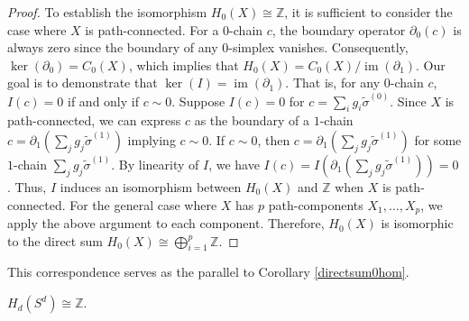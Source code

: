\begin{proof}
	To establish the isomorphism \( H_{0}(X) \cong \mathbb{Z} \), it is sufficient to consider the case where \( X \) is path-connected. For a \( 0 \)-chain \( c \), the boundary operator \( \partial_{0}(c) \) is always zero since the boundary of any \( 0 \)-simplex vanishes. Consequently, \( \ker(\partial_{0}) = C_{0}(X) \), which implies that $H_{0}(X) = C_{0}(X) / \operatorname{im}(\partial_{1})$. Our goal is to demonstrate that \( \ker(I) = \operatorname{im}(\partial_{1}) \). That is, for any \( 0 \)-chain \( c \), \( I(c) = 0 \) if and only if \( c \sim 0 \). Suppose \( I(c) = 0 \) for \( c = \sum_{i} g_{i} \tilde{\sigma}^{(0)} \). Since \( X \) is path-connected, we can express \( c \) as the boundary of a \( 1 \)-chain $c = \partial_{1} ( \sum_{j} g_{j} \tilde{\sigma}^{(1)})$ implying $c \sim 0$. If \( c \sim 0 \), then \( c = \partial_{1} ( \sum_{j} g_{j} \tilde{\sigma}^{(1)}) \) for some \( 1 \)-chain \( \sum_{j} g_{j} \tilde{\sigma}^{(1)} \). By linearity of \( I \), we have	$I(c) = I( \partial_{1} ( \sum_{j} g_{j} \tilde{\sigma}^{(1)} )) = 0$. Thus, \( I \) induces an isomorphism between \( H_{0}(X) \) and \( \mathbb{Z} \) when \( X \) is path-connected. For the general case where \( X \) has \( p \) path-components \( X_{1}, \ldots, X_{p} \), we apply the above argument to each component. Therefore, \( H_{0}(X) \) is isomorphic to the direct sum $H_{0}(X) \cong \bigoplus_{i=1}^{p} \mathbb{Z}$.
\end{proof}

This correspondence serves as the parallel to Corollary \ref{directsum0hom}.

\begin{proposition}
	\( H_{d}(S^{d}) \cong \mathbb{Z} \).
	\end{proposition}

